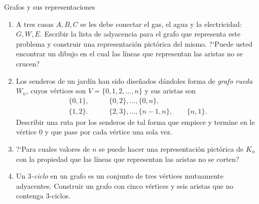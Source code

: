 \begin{section}{Grafos y sus representaciones}
\begin{enumerate}
\item A tres casas $A,B,C$ se les debe conectar el gas, el agua y la electricidad: $G,W,E$.
Escribir la lista de adyacencia para el grafo que representa este
problema y construir una representación pictórica del mismo.
?`Puede usted encontrar un dibujo en el cual las líneas que
representan las aristas no se crucen?
\item Los senderos de un jardín han sido diseñados dándoles forma de {\em grafo rueda}
$W_n$, cuyos vértices son $V=\{0,1,2,\ldots,n\}$ y sus aristas son
$$
\begin{aligned}
\{0,1\},\qquad &\{0,2\},\ldots,\{0,n\}, \\
\{1,2\}.\qquad &\{2,3\},\ldots,\{n-1,n\},\qquad \{n,1\}.
\end{aligned}
$$
Describir una ruta por los senderos de tal forma que empiece y
termine en le vértice $0$ y que pase por cada vértice una sola vez.
\item  ?`Para cuales valores de $n$ se puede hacer una representación pictórica
de $K_n$ con la propiedad que las líneas que representan las aristas no se corten?
\item Un {\it {$3$-ciclo}} en un grafo es un conjunto de tres vértices mutuamente adyacentes.
Construir un grafo con cinco vértices y seis aristas que no
contenga $3$-ciclos.
\end{enumerate}

\end{section}



